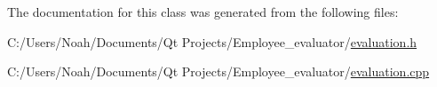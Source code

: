 The documentation for this class was generated from the following files\-:\begin{DoxyCompactItemize}
\item 
C\-:/\-Users/\-Noah/\-Documents/\-Qt Projects/\-Employee\-\_\-evaluator/\hyperlink{evaluation_8h}{evaluation.\-h}\item 
C\-:/\-Users/\-Noah/\-Documents/\-Qt Projects/\-Employee\-\_\-evaluator/\hyperlink{evaluation_8cpp}{evaluation.\-cpp}\end{DoxyCompactItemize}
